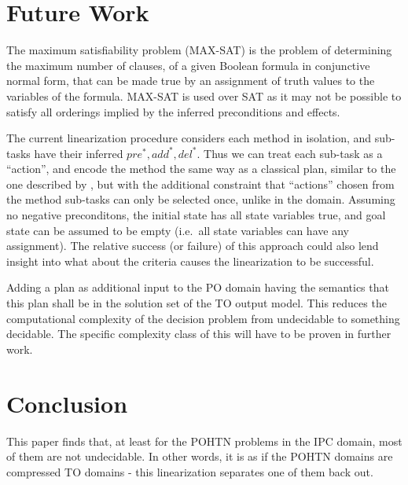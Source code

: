 \documentclass[letterpaper]{article} %
\newcommand{\PreS} {\ensuremath{\mathit{pre^{*}}}}
\newcommand{\AddS} {\ensuremath{\mathit{add^{*}}}}
\newcommand{\DelS} {\ensuremath{\mathit{del^{*}}}}
\begin{document}
\section{Future Work}
The maximum satisfiability problem (MAX-SAT) is the problem of determining the maximum number of clauses, of a given Boolean formula in conjunctive normal form, that can be made true by an assignment of truth values to the variables of the formula. MAX-SAT is used over SAT as it may not be possible to satisfy all orderings implied by the inferred preconditions and effects.

The current linearization procedure considers each method in isolation, and sub-tasks have their inferred $\PreS, \AddS, \DelS$. Thus we can treat each sub-task as a \enquote{action}, and encode the method the same way as a classical plan, similar to the one described by \cite{RINTANEN201245}, but with the additional constraint that \enquote{actions} chosen from the method sub-tasks can only be selected once, unlike in the domain. Assuming no negative preconditons, the initial state has all state variables true, and goal state can be assumed to be empty (i.e.\ all state variables can have any assignment). The relative success (or failure) of this approach could also lend insight into what about the criteria causes the linearization to be successful.


Adding a plan as additional input to the PO domain having the
semantics that this plan shall be in the solution set of the TO output
model. This reduces the computational complexity of the decision problem from undecidable to something decidable. The specific complexity class of this will have to be proven in further work.  %





\section{Conclusion}


This paper finds that, at least for the POHTN problems in the IPC domain, most of them are not undecidable. In other words, it is as if the POHTN domains are compressed TO domains - this linearization separates one of them back out.
\end{document}
